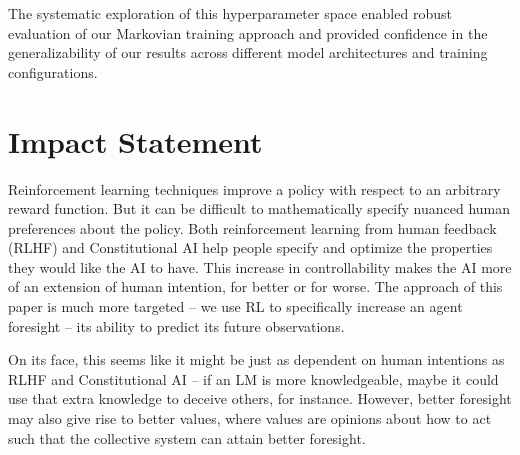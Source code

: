 \documentclass{article} %
\begin{document}
The systematic exploration of this hyperparameter space enabled robust evaluation of our Markovian training approach and provided confidence in the generalizability of our results across different model architectures and training configurations.


\section{Impact Statement}
\label{sec:ethics}
Reinforcement learning techniques improve a policy with respect to an arbitrary reward function. But it can be difficult to mathematically specify nuanced human preferences about the policy. Both reinforcement learning from human feedback (RLHF) \citep{christiano2023deepreinforcementlearninghuman} and Constitutional AI \citep{bai2022constitutional} help people specify and optimize the properties they would like the AI to have. This increase in controllability makes the AI more of an extension of human intention, for better or for worse. The approach of this paper is much more targeted -- we use RL to specifically increase an agent foresight -- its ability to predict its future observations. 

On its face, this seems like it might be just as dependent on human intentions as RLHF and Constitutional AI -- if an LM is more knowledgeable, maybe it could use that extra knowledge to deceive others, for instance. However, better foresight may also give rise to better values, where values are opinions about how to act such that the collective system can attain better foresight.
\end{document}
